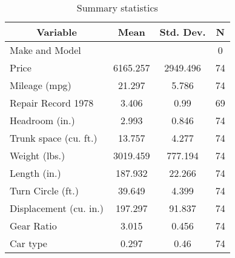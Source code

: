 
\begin{table}[htbp]\centering \caption{Summary statistics \label{sumstat}}
\begin{tabular}{l c c  c}\hline\hline
\multicolumn{1}{c}{\textbf{Variable}} & \textbf{Mean}
 & \textbf{Std. Dev.} & \textbf{N}\\ \hline
Make and Model &  &   & 0\\
Price & 6165.257 & 2949.496  & 74\\
Mileage (mpg) & 21.297 & 5.786  & 74\\
Repair Record 1978 & 3.406 & 0.99  & 69\\
Headroom (in.) & 2.993 & 0.846  & 74\\
Trunk space (cu. ft.) & 13.757 & 4.277  & 74\\
Weight (lbs.) & 3019.459 & 777.194  & 74\\
Length (in.) & 187.932 & 22.266  & 74\\
Turn Circle (ft.) & 39.649 & 4.399  & 74\\
Displacement (cu. in.) & 197.297 & 91.837  & 74\\
Gear Ratio & 3.015 & 0.456  & 74\\
Car type & 0.297 & 0.46  & 74\\
\hline\end{tabular}
\end{table}
